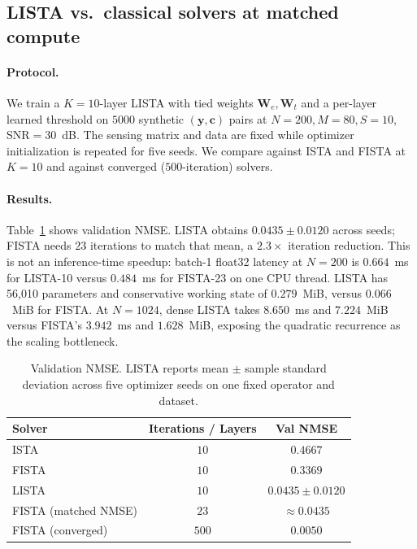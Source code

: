 \documentclass{article}
\begin{document}
\subsection{LISTA vs.\ classical solvers at matched compute}

\paragraph{Protocol.} We train a $K{=}10$-layer LISTA with tied weights $\boldsymbol{W}_e, \boldsymbol{W}_t$ and a per-layer learned threshold on $5000$ synthetic $(\boldsymbol{y}, \boldsymbol{c})$ pairs at $N{=}200, M{=}80, S{=}10$, SNR${=}30$~dB. The sensing matrix and data are fixed while optimizer initialization is repeated for five seeds. We compare against ISTA and FISTA at $K{=}10$ and against converged ($500$-iteration) solvers.

\paragraph{Results.} Table~\ref{tab:lista} shows validation NMSE. LISTA obtains $0.0435\pm0.0120$ across seeds; FISTA needs $23$ iterations to match that mean, a $2.3\times$ iteration reduction. This is not an inference-time speedup: batch-1 float32 latency at $N{=}200$ is $0.664$~ms for LISTA-10 versus $0.484$~ms for FISTA-23 on one CPU thread. LISTA has 56,010 parameters and conservative working state of $0.279$~MiB, versus $0.066$~MiB for FISTA. At $N{=}1024$, dense LISTA takes $8.650$~ms and $7.224$~MiB versus FISTA's $3.942$~ms and $1.628$~MiB, exposing the quadratic recurrence as the scaling bottleneck.

\begin{table}[t]
  \caption{Validation NMSE. LISTA reports mean $\pm$ sample standard deviation across five optimizer seeds on one fixed operator and dataset.}
  \label{tab:lista}
  \centering
  \begin{tabular}{lcc}
    \toprule
    Solver & Iterations / Layers & Val NMSE \\
    \midrule
    ISTA   & $10$  & $0.4667$ \\
    FISTA  & $10$  & $0.3369$ \\
    LISTA  & $10$  & $\mathbf{0.0435\pm0.0120}$ \\
    \midrule
    FISTA (matched NMSE) & $23$ & $\approx 0.0435$ \\
    FISTA (converged)    & $500$ & $0.0050$ \\
    \bottomrule
  \end{tabular}
\end{table}
\end{document}
